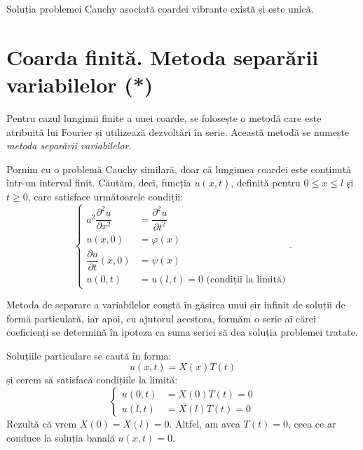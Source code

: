 \begin{remark}\label{rk:ex-unic-coarda}
    Soluția problemei Cauchy asociată coardei vibrante există și este unică.
\end{remark}


\section{Coarda finită. Metoda separării variabilelor (*)}

Pentru cazul lungimii finite a unei coarde, se folosește o metodă care este
atribuită lui Fourier și utilizează dezvoltări în serie. Această metodă se
numește \emph{metoda separării variabilelor}.

Pornim cu o problemă Cauchy similară, doar că lungimea coardei este conținută
într-un interval finit. Căutăm, deci, funcția $ u(x, t) $, definită pentru
$ 0 \leq x \leq l $ și $ t \geq 0 $, care satisface următoarele condiții:
\[
    \begin{cases}
        a^2 \dfrac{\partial^2 u}{\partial x^2} &= \dfrac{\partial^2 u}{\partial t^2} \\
        u(x, 0) &= \varphi(x) \\
        \dfrac{\partial u}{\partial t}(x, 0) &= \psi(x) \\
        u(0, t) &= u(l, t) = 0 \text{ (condiții la limită)}
    \end{cases}.
\]

Metoda de separare a variabilelor constă în găsirea unui șir infinit de soluții
de formă particulară, iar apoi, cu ajutorul acestora, formăm o serie ai cărei
coeficienți se determină în ipoteza ca suma seriei să dea soluția problemei tratate.

Soluțiile particulare se caută în forma:
\[
    u(x, t) = X(x)T(t)
\]
și cerem să satisfacă condițiile la limită:
\[
    \begin{cases}
        u(0, t) &= X(0)T(t) = 0 \\
        u(l, t) &= X(l)T(t) = 0
    \end{cases}
\]
Rezultă că vrem $ X(0) = X(l) = 0 $. Altfel, am avea $ T(t) = 0 $, ceea ce ar conduce la
soluția banală $ u(x, t) = 0 $.

